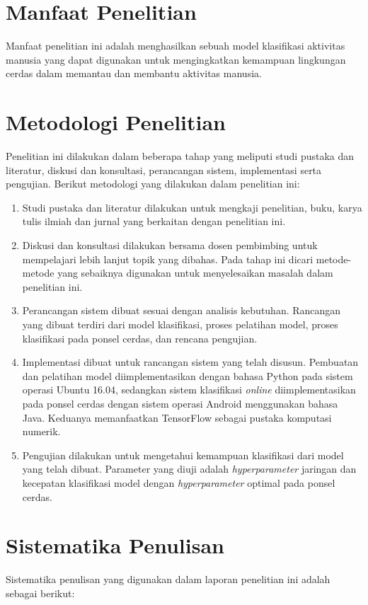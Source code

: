 \section{Manfaat Penelitian}
Manfaat penelitian ini adalah menghasilkan sebuah model klasifikasi aktivitas manusia yang dapat digunakan untuk mengingkatkan kemampuan lingkungan cerdas dalam memantau dan membantu aktivitas manusia.

\section{Metodologi Penelitian}
Penelitian ini dilakukan dalam beberapa tahap yang meliputi studi pustaka dan literatur, diskusi dan konsultasi, perancangan sistem, implementasi serta pengujian. Berikut metodologi yang dilakukan dalam penelitian ini:

\begin{enumerate}
    \item Studi pustaka dan literatur dilakukan untuk mengkaji penelitian, buku, karya tulis ilmiah dan jurnal yang berkaitan dengan penelitian ini.
    \item Diskusi dan konsultasi dilakukan bersama dosen pembimbing untuk mempelajari lebih lanjut topik yang dibahas. Pada tahap ini dicari metode-metode yang sebaiknya digunakan untuk menyelesaikan masalah dalam penelitian ini.
    \item Perancangan sistem dibuat sesuai dengan analisis kebutuhan. Rancangan yang dibuat terdiri dari model klasifikasi, proses pelatihan model, proses klasifikasi pada ponsel cerdas, dan rencana pengujian.
    \item Implementasi dibuat untuk rancangan sistem yang telah disusun. Pembuatan dan pelatihan model diimplementasikan dengan bahasa Python pada sistem operasi Ubuntu 16.04, sedangkan sistem klasifikasi \textit{online} diimplementasikan pada ponsel cerdas dengan sistem operasi Android menggunakan bahasa Java. Keduanya memanfaatkan TensorFlow sebagai pustaka komputasi numerik.
    \item Pengujian dilakukan untuk mengetahui kemampuan klasifikasi dari model yang telah dibuat. Parameter yang diuji adalah \textit{hyperparameter} jaringan dan kecepatan klasifikasi model dengan \textit{hyperparameter} optimal pada ponsel cerdas.
\end{enumerate}

\section{Sistematika Penulisan}
Sistematika penulisan yang digunakan dalam laporan penelitian ini adalah sebagai berikut:

